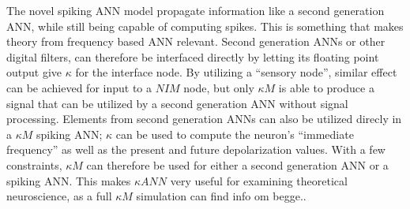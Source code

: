 %	
%
%
		
	

	The novel spiking ANN model propagate information like a second generation ANN, while still being capable of computing spikes.
	This is something that makes theory from frequency based ANN relevant.
	Second generation ANNs or other digital filters, can therefore be interfaced directly by letting its floating point output give $\kappa$ for the interface node.
	By utilizing a ``sensory node'', similar effect can be achieved for input to a $NIM$ node, but only $\kappa M$ is able to produce a signal that can be utilized by a second generation ANN without signal processing.
%	
	Elements from second generation ANNs can also be utilized direcly in a $\kappa M$ spiking ANN;
		$\kappa$ can be used to compute the neuron's ``immediate frequency'' as well as the present and future depolarization values. %
	With a few constraints, $\kappa M$ can therefore be used for either a second generation ANN or a spiking ANN.
	This makes $\kappa ANN$ very useful for examining theoretical neuroscience, as a full $\kappa M$ simulation can find info om begge..

